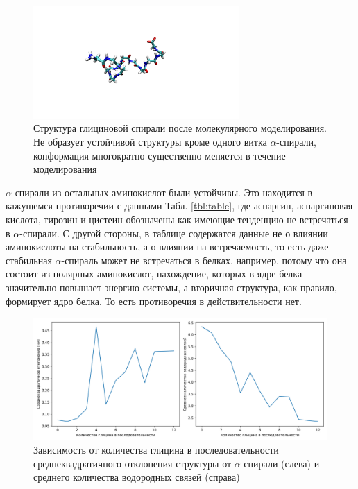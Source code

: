 \documentclass[
11pt,%
tightenlines,%
twoside,%
onecolumn,%
nofloats,%
nobibnotes,%
nofootinbib,%
superscriptaddress,%
noshowpacs,%
centertags]%
{revtex4}
\begin{document}
\begin{figure}[h]
	\centering
	\includegraphics[width=0.7\textwidth]{gly_end}
	\caption{Структура глициновой спирали после молекулярного моделирования. 
		Не образует устойчивой структуры кроме одного витка $\alpha$-спирали, 
		конформация многократно существенно меняется в течение моделирования}
\end{figure}

$\alpha$-спирали из остальных аминокислот были устойчивы. 
Это находится в кажущемся противоречии с данными Табл. \ref{tbl:table}, 
где аспаргин, аспаргиновая кислота, тирозин и цистеин 
обозначены как имеющие тенденцию не встречаться в $\alpha$-спирали.
С другой стороны, в таблице содержатся данные не о влиянии аминокислоты на стабильность,
а о влиянии на встречаемость, 
то есть даже стабильная $\alpha$-спираль может не встречаться в белках,
например, потому что она состоит из полярных аминокислот, нахождение, 
которых в ядре белка значительно повышает энергию системы, а вторичная структура,
как правило, формирует ядро белка. То есть противоречия в действительности нет.\par

\begin{figure}[h]
	\centering
	\includegraphics[width=\textwidth]{gly}
	\caption{Зависимость от количества глицина в последовательности среднеквадратичного отклонения структуры от $\alpha$-спирали (слева) и среднего количества водородных связей (справа)}
	\label{pic:gly}
\end{figure}
\end{document}
